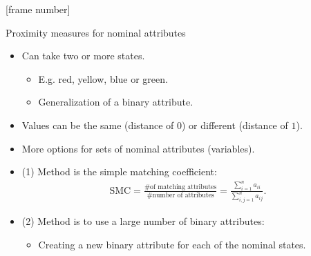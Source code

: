 \documentclass[aspectratio=169,t]{beamer}
\begin{document}
  {
    [frame number]
    \begin{frame}{Proximity measures for nominal attributes}
    \begin{itemize}
      \item Can take two or more states.
      \begin{itemize}
        \item E.g. red, yellow, blue or green.
        \item Generalization of a binary attribute.
      \end{itemize}
      \item Values can be the same (distance of $0$) or different (distance of $1$).
      \item More options for sets of nominal attributes (variables).
      \item (1) Method is the simple matching coefficient:
      \begin{align}
        \text{SMC} = \frac{\# \text{of matching attributes}}{\# \text{number of attributes}} = \frac{\sum\limits_{i=1}^{n} a_{ii}}{\sum\limits_{i,j=1}^{n}a_{ij}}.
      \end{align}
      \item (2) Method is to use a large number of binary attributes:
      \begin{itemize}
        \item Creating a new binary attribute for each of the nominal states.
      \end{itemize}
    \end{itemize}
    \end{frame}
  }
\end{document}
